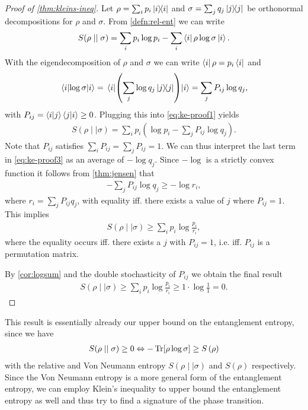 \begin{proof}[Proof of \cref{thm:kleins-ineq}]
  Let $\rho=\sum_i p_i \dyad{i}$ and $\sigma=\sum_j q_j \dyad{j}$ be
  orthonormal decompositions for $\rho$ and $\sigma$. From \cref{defn:rel-ent}
  we can write
  \begin{align}\label{eq:ke-proof1}
    S(\rho\mid\mid\sigma) = \sum_i p_i \log p_i - \sum_i \bra{i} \rho
    \log\sigma \ket{i}
  .\end{align}
  With the eigendecomposition of $\rho$ and $\sigma$ we can write $\bra{i} \rho = p_i
  \bra{i}$ and
  \begin{align}\label{eq:ke-proof2}
    \expval{\log\sigma}{i} = \expval{\left(\sum_j \log q_j \dyad{j}
    \right)}{i} = \sum_j P_{ij}\log q_j  
  ,\end{align}
  with $P_{ij} = \ip{i}{j}\ip{j}{i} \geq 0$. 
  Plugging this into \cref{eq:ke-proof1} yields
  \begin{align}\label{eq:ke-proof3}
    S(\rho\mid\mid\sigma) = \sum_i p_i \left(\log p_i - \sum_j P_{ij} \log q_j \right)
  .\end{align}
  Note that $P_{ij}$ satisfies $\sum_i P_{ij} = \sum_j P_{ij} = 1$. We can thus
  interpret the last term in \cref{eq:ke-proof3} as an average of $-\log q_j$.
  Since $-\log$ is a strictly convex function it follows from \cref{thm:jensen}
  that
  \begin{align}
    -\sum_j P_{ij} \log q_j \geq - \log r_i
  ,\end{align}
  where $r_i = \sum_j P_{ij} q_j$, with equality iff. there exists a value of
  $j$ where $P_{ij}=1$. This implies 
  \begin{align}
    S(\rho\mid\mid\sigma) \geq \sum_i p_i \log\frac{p_i}{r_i}
  ,\end{align}
  where the equality occurs iff. there exists a $j$ with $P_{ij}=1$, i.e. iff.
  $P_{ij}$ is a permutation matrix.

  By \cref{cor:logsum} and the double stochasticity of $P_{ij}$ we obtain the
  final result
  \begin{align}
     S(\rho\mid\mid\sigma) \geq \sum_i p_i \log\frac{p_i}{r_i} \geq 1\cdot \log
     \frac{1}{1} = 0
  .\end{align}
\end{proof}

This result is essentially already our upper bound on the entanglement entropy,
since we have
\begin{align}
  \label{eq:kleins-ineq}
  S(\rho \mid\mid \sigma) \geq 0 \Leftrightarrow -\Tr[\rho\log\sigma]\geq
  S\left( \rho \right) 
\end{align}
with the relative and Von Neumann entropy $S(\rho\mid\mid\sigma)$ and
$S(\rho)$ respectively. Since the Von Neumann entropy is a more general form of
the entanglement entropy, we can employ Klein's inequality to upper bound the
entanglement entropy as well and thus try to find a signature of the phase
transition.

